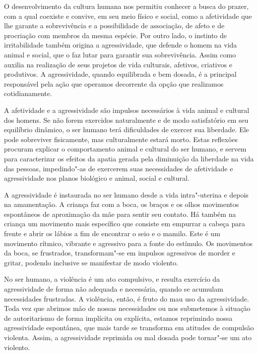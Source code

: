O desenvolvimento da cultura humana nos permitiu conhecer a busca do
prazer, com a qual coexiste e convive, em seu meio físico e social, como
a afetividade que lhe garante a sobrevivência e a possibilidade de
associação, de afeto e de procriação com membros da mesma espécie. Por
outro lado, o instinto de irritabilidade também origina a agressividade,
que defende o homem na vida animal e social, que o faz lutar para
garantir sua sobrevivência. Assim como auxilia na realização de seus
projetos de vida culturais, afetivos, criativos e produtivos. A
agressividade, quando equilibrada e bem dosada, é a principal
responsável pela ação que operamos decorrente da opção que realizamos
cotidianamente.

A afetividade e a agressividade são impulsos necessários à vida
animal e cultural dos homens. Se não forem exercidos naturalmente e de
modo satisfatório em seu equilíbrio dinâmico, o ser humano terá
dificuldades de exercer sua liberdade. Ele pode sobreviver fisicamente,
mas culturalmente estará morto. Estas reflexões procuram explicar o
comportamento animal e cultural do ser humano, e servem para
caracterizar os efeitos da apatia gerada pela diminuição da liberdade na
vida das pessoas, impedindo"-as de exercerem suas necessidades de
afetividade e agressividade nos planos biológico e animal, social e
cultural.

A agressividade é instaurada no ser humano desde a vida intra"-uterina e
depois na amamentação. A criança faz com a boca, os braços e os olhos
movimentos espontâneos de aproximação da mãe para sentir seu contato. Há
também na criança um movimento mais específico que consiste em empurrar
a cabeça para frente e abrir os lábios a fim de encontrar o seio e o
mamilo. Este é um movimento rítmico, vibrante e agressivo para a fonte
do estímulo. Os movimentos da boca, se frustrados, transformam"-se em
impulsos agressivos de morder e gritar, podendo inclusive se manifestar
de modo violento.

No ser humano, a violência é um ato compulsivo, e resulta exercício da
agressividade de forma não adequada e necessária, quando se acumulam
necessidades frustradas. A violência, então, é fruto do mau uso da
agressividade. Toda vez que abrimos mão de nossas necessidades ou nos
submetemos à situação de autoritarismo de forma implícita ou explícita,
estamos reprimindo nossa agressividade espontânea, que mais tarde se
transforma em atitudes de compulsão violenta. Assim, a agressividade
reprimida ou mal dosada pode tornar"-se um ato violento.


